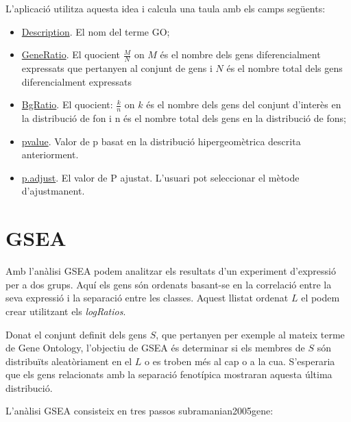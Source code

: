 L'aplicació utilitza aquesta idea i calcula una taula amb els camps següents:


\begin{itemize}
\item \underline{Description}. El nom del terme GO;
\item \underline{GeneRatio}. El quocient $\frac{M}{N}$ on $M$ és el nombre dels gens diferencialment expressats que pertanyen al conjunt de gens i $N$ és el nombre total dels gens diferencialment expressats 
\item \underline{BgRatio}. El quocient: $\frac{k}{n}$ on $k$ és el nombre dels gens del conjunt d'interès en la distribució de fon i n és el nombre total dels gens en la distribució de fons;
\item \underline{pvalue}. Valor de p basat en la distribució hipergeomètrica descrita anteriorment.
\item \underline{p.adjust}. El valor de P ajustat. L'usuari pot seleccionar el mètode d'ajustmanent.
\end{itemize}


\section{GSEA}

Amb l'anàlisi GSEA podem analitzar els resultats d'un experiment d'expressió per a dos grups. Aquí els gens són ordenats basant-se en la correlació entre la seva expressió i la separació entre les classes. Aquest llistat ordenat $L$ el podem crear utilitzant els \textit{logRatios}.

Donat el conjunt definit dels gens $S$, que pertanyen per exemple al mateix terme de Gene Ontology, l'objectiu de GSEA és determinar si els membres de $S$ són distribuïts aleatòriament en el $L$ o es troben més al cap o a la cua. S'esperaria que els gens relacionats amb la separació fenotípica mostraran aquesta última distribució. 

L'anàlisi GSEA consisteix en tres passos subramanian2005gene:

